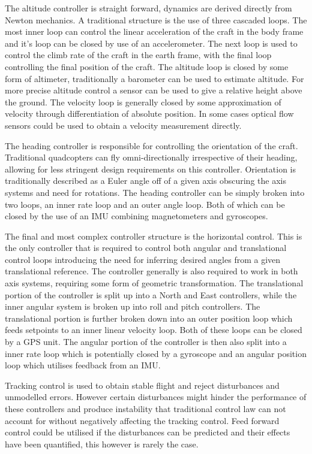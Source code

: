 	The altitude controller is straight forward, dynamics are derived directly from Newton mechanics. A traditional structure is the use of three cascaded loops. The most inner loop can control the linear acceleration of the craft in the body frame and it's loop can be closed by use of an accelerometer. The next loop is used to control the climb rate of the craft in the earth frame, with the final loop controlling the final position of the craft. The altitude loop is closed by some form of altimeter, traditionally a barometer can be used to estimate altitude. For more precise altitude control a sensor can be used to give a relative height above the ground. The velocity loop is generally closed by some approximation of velocity through differentiation of absolute position. In some cases optical flow sensors could be used to obtain a velocity measurement directly.
	
	The heading controller is responsible for controlling the orientation of the craft. Traditional quadcopters can fly omni-directionally irrespective of their heading, allowing for less stringent design requirements on this controller. Orientation is traditionally described as a Euler angle off of a given axis obscuring the axis systems and need for rotations. The heading controller can be simply broken into two loops, an inner rate loop and an outer angle loop. Both of which can be closed by the use of an IMU combining magnetometers and gyroscopes.
	
	The final and most complex controller structure is the horizontal control. This is the only controller that is required to control both angular and translational control loops introducing the need for inferring desired angles from a given translational reference. The controller generally is also required to work in both axis systems, requiring some form of geometric transformation. The translational portion of the controller is split up into a North and East controllers, while the inner angular system is broken up into roll and pitch controllers. The translational portion is further broken down into an outer position loop which feeds setpoints to an inner linear velocity loop. Both of these loops can be closed by a GPS unit. The angular portion of the controller is then also split into a inner rate loop which is potentially closed by a gyroscope and an angular position loop which utilises feedback from an IMU.
	
	Tracking control is used to obtain stable flight and reject disturbances and unmodelled errors. However certain disturbances might hinder the performance of these controllers and produce instability that traditional control law can not account for without negatively affecting the tracking control. Feed forward control could be utilised if the disturbances can be predicted and their effects have been quantified, this however is rarely the case.   
	
